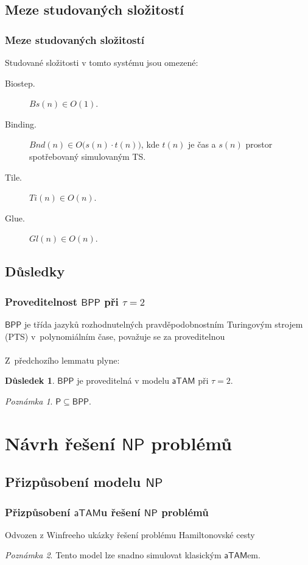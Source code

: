 \documentclass[10pt]{beamer}
\renewcommand{\P}{\mathsf{P}}
\newcommand{\NP}{\mathsf{NP}}
\newcommand{\BPP}{\mathsf{BPP}}
\newcommand{\atam}{\mathsf{aTAM}}
\theoremstyle{definition}
\newtheorem{dusl}[tvr]{Důsledek}
\theoremstyle{remark}
\newtheorem{pozn}{Poznámka}
\begin{document}
\subsection{Meze studovaných složitostí}
\begin{frame}
\frametitle{Meze studovaných složitostí}
	\begin{lemma}
		Studované složitosti v tomto systému jsou omezené:
		\begin{description}
			\item[Biostep.] $Bs(n) \in O(1)$.
			\item[Binding.] $Bnd(n) \in O\bigl(s(n)\cdot t(n)\bigr)$, kde $t(n)$ je čas a $s(n)$ prostor spotřebovaný simulovaným TS.
			\item[Tile.] $Ti(n) \in O(n)$.
			\item[Glue.] $Gl(n) \in O(n)$.
		\end{description}
	\end{lemma}
\end{frame}

\subsection{Důsledky}
\begin{frame}
\frametitle{Proveditelnost $\BPP$ při $\tau=2$}
	$\BPP$ je třída jazyků rozhodnutelných pravděpodobnostním Turingovým strojem (PTS) v~polynomiálním čase, považuje se za proveditelnou\\
	~\\
	Z~předchozího lemmatu plyne:
	\begin{dusl}
		$\BPP$ je proveditelná v modelu $\atam$ při $\tau=2$.
	\end{dusl}
	\begin{pozn}
		$\P \subseteq \BPP$.
	\end{pozn}
\end{frame}

\section{Návrh řešení $\NP$ problémů}
\subsection{Přizpůsobení modelu $\NP$}
\begin{frame}
\frametitle{Přizpůsobení $\atam$u řešení $\NP$ problémů}
	Odvozen z Winfreeho ukázky řešení problému Hamiltonovské cesty
	\begin{pozn}
		Tento model lze snadno simulovat klasickým $\atam$em.
	\end{pozn}
\end{frame}
\end{document}
